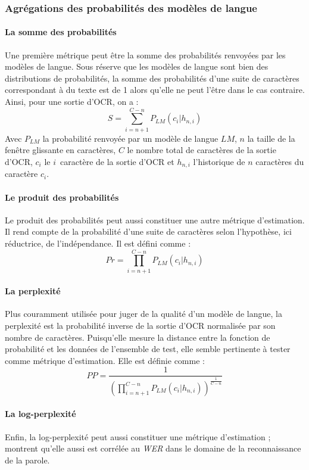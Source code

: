\documentclass[10pt,twoside]{article}
\begin{document}
        
	   \subsubsection{Agrégations des probabilités des modèles de langue}\label{metrics}
	       \paragraph{La somme des probabilités}
	       Une première métrique peut être la somme des probabilités renvoyées par les modèles de langue. Sous réserve que les 
           modèles de langue sont bien des distributions de probabilités, la somme des probabilités d'une suite de caractères 
           correspondant à du texte est de 1 alors qu'elle ne peut l'être dans le cas contraire. Ainsi,
           pour une
	       sortie d'OCR, on a : 
	       $$S = \sum_{i=n+1}^{C-n}P_{LM}(c_{i} | h_{n,i})$$
	       Avec $P_{LM}$ la probabilité renvoyée par un modèle de langue $LM$, $n$ 
	       la taille de la fenêtre glissante en caractères, $C$ le nombre total de caractères de la sortie d'OCR, $c_{i}$ 
	       le $i$\ieme~caractère de la sortie d'OCR et $h_{n,i}$ l'historique de $n$ caractères du caractère $c_{i}$.

	       \paragraph{Le produit des probabilités}
	       Le produit des probabilités peut aussi constituer une autre métrique d'estimation. Il rend compte de
           la probabilité d'une suite de caractères selon l'hypothèse, ici réductrice, de l'indépendance. 
           Il est défini
	       comme :
	       $$Pr = \prod_{i=n+1}^{C-n}P_{LM}(c_{i} | h_{n,i})$$

	       \paragraph{La perplexité}
	       Plus couramment utilisée pour juger de la qualité d'un modèle de langue, la perplexité est la probabilité inverse de la sortie
	       d'OCR normalisée par son nombre de caractères. Puisqu'elle mesure la distance entre la fonction de probabilité et les données de l'ensemble
           de test, elle semble pertinente à tester comme métrique d'estimation.
           Elle est définie comme : 
	        $$PP = \frac{1}{(\prod_{i=n+1}^{C-n}P_{LM}(c_{i} | h_{n,i}))^{\frac{1}{C-n}}}$$

	       \paragraph{La log-perplexité}
           Enfin, la log-perplexité peut aussi constituer une métrique d'estimation ; \cite{Chen1998a} montrent qu'elle aussi est corrélée au 
           \textit{WER} dans le domaine de la reconnaissance de la parole.
\end{document}
